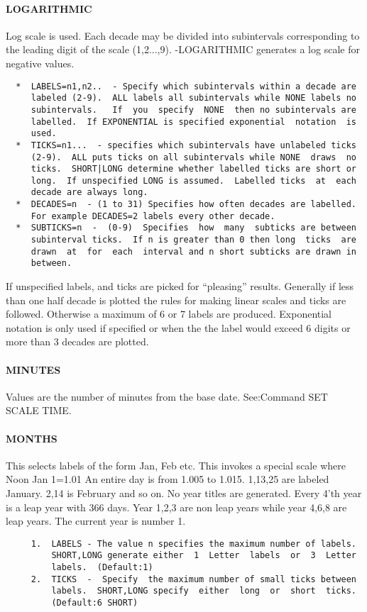 \paragraph{LOGARITHMIC}
Log  scale  is  used.   Each  decade may be divided into subintervals
corresponding  to  the  leading  digit  of  the   scale   (1,2...,9).
-LOGARITHMIC generates a log scale for negative values.  
\begin{verbatim}
  *  LABELS=n1,n2..  - Specify which subintervals within a decade are
     labeled (2-9).  ALL labels all subintervals while NONE labels no
     subintervals.   If  you  specify  NONE  then no subintervals are
     labelled.  If EXPONENTIAL is specified exponential  notation  is
     used.  
  *  TICKS=n1...  - specifies which subintervals have unlabeled ticks
     (2-9).  ALL puts ticks on all subintervals while NONE  draws  no
     ticks.  SHORT|LONG determine whether labelled ticks are short or
     long.  If unspecified LONG is assumed.  Labelled ticks  at  each
     decade are always long.  
  *  DECADES=n  - (1 to 31) Specifies how often decades are labelled.
     For example DECADES=2 labels every other decade.  
  *  SUBTICKS=n  -  (0-9)  Specifies  how  many  subticks are between
     subinterval ticks.  If n is greater than 0 then long  ticks  are
     drawn  at  for  each  interval and n short subticks are drawn in
     between.  
\end{verbatim}
If  unspecified  labels, and ticks are picked for ``pleasing'' results.
Generally if less than one half  decade  is  plotted  the  rules  for
making  linear scales and ticks are followed.  Otherwise a maximum of
6 or 7 labels are produced.  Exponential notation  is  only  used  if
specified  or when the the label would exceed 6 digits or more than 3
decades are plotted.  
\paragraph{MINUTES   }
Values   are   the   number   of   minutes   from   the   base  date.
See:Command SET SCALE TIME.  
\paragraph{MONTHS    }
This selects labels of the form Jan, Feb etc.  This invokes a special
scale where Noon Jan 1=1.01 An entire day is  from  1.005  to  1.015.
1,13,25  are  labeled  January.  2,14 is February and so on.  No year
titles are generated.  Every 4'th year is a leap year with 366  days.
Year  1,2,3  are non leap years while year 4,6,8 are leap years.  The
current year is number 1.  
\begin{verbatim}
     1.  LABELS - The value n specifies the maximum number of labels.
         SHORT,LONG generate either  1  Letter  labels  or  3  Letter
         labels.  (Default:1) 
     2.  TICKS  -  Specify  the maximum number of small ticks between
         labels.  SHORT,LONG specify  either  long  or  short  ticks.
         (Default:6 SHORT) 
\end{verbatim}
